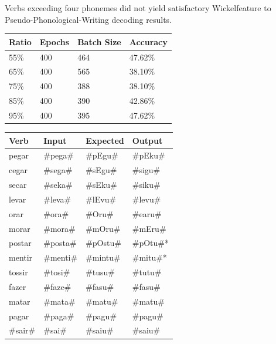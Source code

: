\documentclass[a0,portrait]{a0poster}
\begin{document}
\begin{multicols}{2}
Verbs exceeding four phonemes did not yield satisfactory Wickelfeature to Pseudo-Phonological-Writing decoding results.

\begin{center}\vspace{1cm}
\begin{minipage}[b]{0.45\linewidth}\centering
\begin{tabular}{llll}
\textbf{Ratio} & \textbf{Epochs} & \textbf{Batch Size} & \textbf{Accuracy} \\
\toprule
55\% & 400 & 464 & 47.62\% \\
65\% & 400 & 565 & 38.10\% \\
75\% & 400 & 388 & 38.10\% \\
85\% & 400 & 390 & 42.86\% \\
95\% & 400 & 395 & 47.62\%
\end{tabular}
\end{minipage}
\hspace{0.5cm}
\begin{minipage}[b]{0.45\linewidth}
\centering
\begin{tabular}{llll}
\textbf{Verb} & \textbf{Input} & \textbf{Expected} & \textbf{Output} \\ \hline
pegar & \#pega\# & \#pEgu\# & \#pEku\# \\
cegar & \#sega\# & \#sEgu\# & \#sigu\# \\
secar & \#seka\# & \#sEku\# & \#siku\# \\
levar & \#leva\# & \#lEvu\# & \#levu\# \\
orar & \#ora\# & \#Oru\# & \#earu\# \\
morar & \#mora\# & \#mOru\# & \#mEru\# \\
postar & \#posta\# & \#pOstu\# & \#pOtu\#* \\
mentir & \#menti\# & \#mintu\# & \#mitu\#* \\
tossir & \#tosi\# & \#tusu\# & \#tutu\# \\
fazer & \#faze\# & \#fasu\# & \#fasu\# \\
matar & \#mata\# & \#matu\# & \#matu\# \\
pagar & \#paga\# & \#pagu\# & \#pagu\# \\
\#sair\# & \#sai\# & \#saiu\# & \#saiu\#
\end{tabular}
\end{minipage}
\end{center}



\end{multicols}
\end{document}
